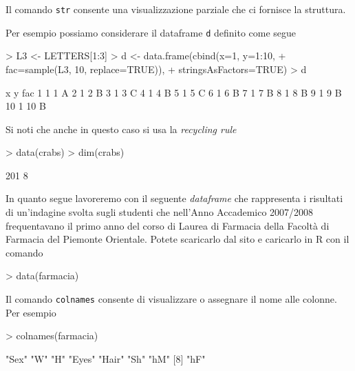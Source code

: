 \documentclass[onecolumn,12pt]{book}
\begin{document}
Il comando \texttt{str} consente una visualizzazione parziale che ci fornisce la struttura.
 
\small
\begin{Schunk}
\end{Schunk}
\normalsize
Per esempio possiamo considerare il dataframe \texttt{d} definito come segue 
\begin{Schunk}
\begin{Sinput}
> L3 <- LETTERS[1:3]
> d <- data.frame(cbind(x=1, y=1:10,
+ fac=sample(L3, 10, replace=TRUE)),
+ stringsAsFactors=TRUE)
> d
\end{Sinput}
\begin{Soutput}
   x  y fac
1  1  1   A
2  1  2   B
3  1  3   C
4  1  4   B
5  1  5   C
6  1  6   B
7  1  7   B
8  1  8   B
9  1  9   B
10 1 10   B
\end{Soutput}
\end{Schunk}
Si noti che anche in questo caso si usa la \emph{recycling rule}
\begin{Schunk}
\begin{Sinput}
> data(crabs)
> dim(crabs)
\end{Sinput}
\begin{Soutput}
[1] 201   8
\end{Soutput}
\end{Schunk}
In quanto segue lavoreremo con il seguente \emph{dataframe} che rappresenta i risultati di un'indagine svolta sugli studenti che nell'Anno Accademico 2007/2008 frequentavano il primo anno del corso di Laurea di Farmacia della Facolt\`a di Farmacia del Piemonte Orientale. Potete scaricarlo dal sito e caricarlo in {\textsf R} con il comando
\begin{Schunk}
\begin{Sinput}
> data(farmacia)
\end{Sinput}
\end{Schunk}
Il comando \texttt{colnames}  consente di  visualizzare o assegnare il nome alle colonne.
Per esempio
\begin{Schunk}
\begin{Sinput}
> colnames(farmacia)
\end{Sinput}
\begin{Soutput}
[1] "Sex"  "W"    "H"    "Eyes" "Hair" "Sh"   "hM"  
[8] "hF"  
\end{Soutput}
\end{Schunk}
\end{document}
